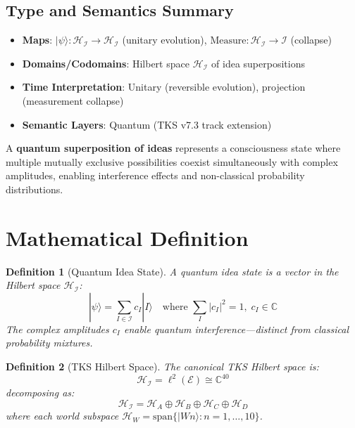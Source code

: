\documentclass[11pt,twoside]{book}
\newcommand{\Ideas}{\mathcal{I}}
\newcommand{\Elements}{\mathcal{E}}
\newtheorem{definition}{Definition}[chapter]
\begin{document}
\subsection*{Type and Semantics Summary}
\begin{itemize}
    \item \textbf{Maps}: $|\psi\rangle : \mathcal{H}_{\Ideas} \to \mathcal{H}_{\Ideas}$ (unitary evolution), $\mathrm{Measure} : \mathcal{H}_{\Ideas} \to \Ideas$ (collapse)
    \item \textbf{Domains/Codomains}: Hilbert space $\mathcal{H}_{\Ideas}$ of idea superpositions
    \item \textbf{Time Interpretation}: Unitary (reversible evolution), projection (measurement collapse)
    \item \textbf{Semantic Layers}: Quantum (TKS v7.3 track extension)
\end{itemize}

\begin{tcolorbox}[colback=green!5!white,colframe=green!75!black,title=\textbf{Definition: Quantum Superposition of Ideas},breakable]
A \textbf{quantum superposition of ideas} represents a consciousness state where
multiple mutually exclusive possibilities coexist simultaneously with complex
amplitudes, enabling interference effects and non-classical probability distributions.
\end{tcolorbox}

\section{Mathematical Definition}

\begin{definition}[Quantum Idea State]
\label{def:quantum-idea}
A \emph{quantum idea state} is a vector in the Hilbert space $\mathcal{H}_{\Ideas}$:
\[
    |\psi\rangle = \sum_{I \in \Ideas} c_I |I\rangle
    \quad \text{where } \sum_I |c_I|^2 = 1, \; c_I \in \mathbb{C}
\]
The complex amplitudes $c_I$ enable quantum interference---distinct from classical
probability mixtures.
\end{definition}

\begin{definition}[TKS Hilbert Space]
\label{def:tks-hilbert}
The canonical TKS Hilbert space is:
\[
    \mathcal{H}_{\Ideas} = \ell^2(\Elements) \cong \mathbb{C}^{40}
\]
decomposing as:
\[
    \mathcal{H}_{\Ideas} = \mathcal{H}_A \oplus \mathcal{H}_B \oplus \mathcal{H}_C \oplus \mathcal{H}_D
\]
where each world subspace $\mathcal{H}_W = \mathrm{span}\{|Wn\rangle : n = 1, \ldots, 10\}$.
\end{definition}
\end{document}

